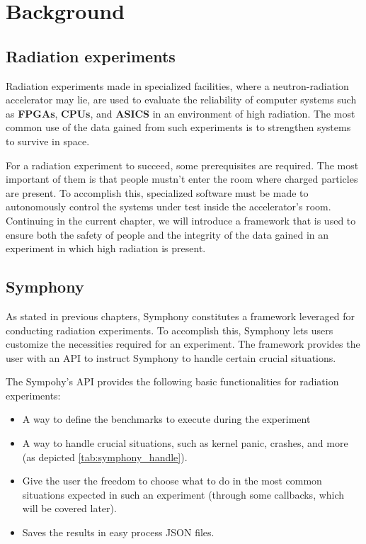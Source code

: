 \section{Background}

\subsection{Radiation experiments}
Radiation experiments made in specialized facilities, where a neutron-radiation accelerator may lie, are used to evaluate the reliability of computer systems such as \textbf{FPGAs}, \textbf{CPUs}, and \textbf{ASICS} in an environment of high radiation. The most common use of the data gained from such experiments is to strengthen systems to survive in space. 

For a radiation experiment to succeed, some prerequisites are required. The most important of them is that people mustn't enter the room where charged particles are present. To accomplish this, specialized software must be made to autonomously control the systems under test inside the accelerator's room. Continuing in the current chapter, we will introduce a framework that is used to ensure both the safety of people and the integrity of the data gained in an experiment in which high radiation is present.

\subsection{Symphony}
As stated in previous chapters, Symphony constitutes a framework leveraged for conducting radiation experiments. To accomplish this, Symphony lets users customize the necessities required for an experiment. The framework provides the user with an API to instruct Symphony to handle certain crucial situations.


The Sympohy's API provides the following basic functionalities for radiation experiments:
\begin{itemize}
  \item A way to define the benchmarks to execute during the experiment
  \item A way to handle crucial situations, such as kernel panic, crashes, and more (as depicted \autoref{tab:symphony_handle}).
  \item Give the user the freedom to choose what to do in the most common situations expected in such an experiment (through some callbacks, which will be covered later). 
  \item Saves the results in easy process JSON files.
\end{itemize}

